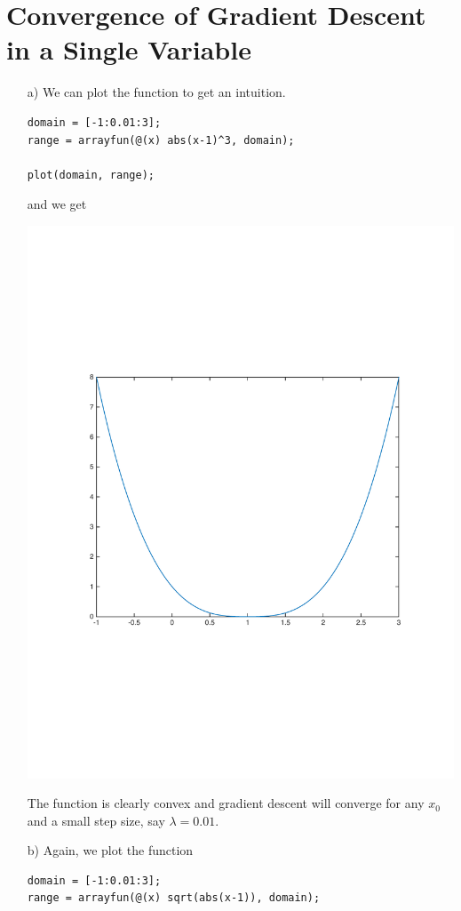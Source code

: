 \documentclass[11pt]{article}
\begin{document}
\section{Convergence of Gradient Descent in a Single Variable}
\begin{itemize}
    \item[a)] We can plot the function to get an intuition.
        \begin{lstlisting}
domain = [-1:0.01:3];
range = arrayfun(@(x) abs(x-1)^3, domain);

plot(domain, range);\end{lstlisting}
        and we get
        \begin{center}
        \includegraphics[width=\linewidth]{3a}
        \end{center}
        
        The function is clearly convex and gradient descent will converge for any $x_0$ and a small step size, say $\lambda = 0.01$.

    \item[b)] Again, we plot the function
    \begin{lstlisting}
domain = [-1:0.01:3];
range = arrayfun(@(x) sqrt(abs(x-1)), domain);


\end{lstlisting}
\end{itemize}
\end{document}
